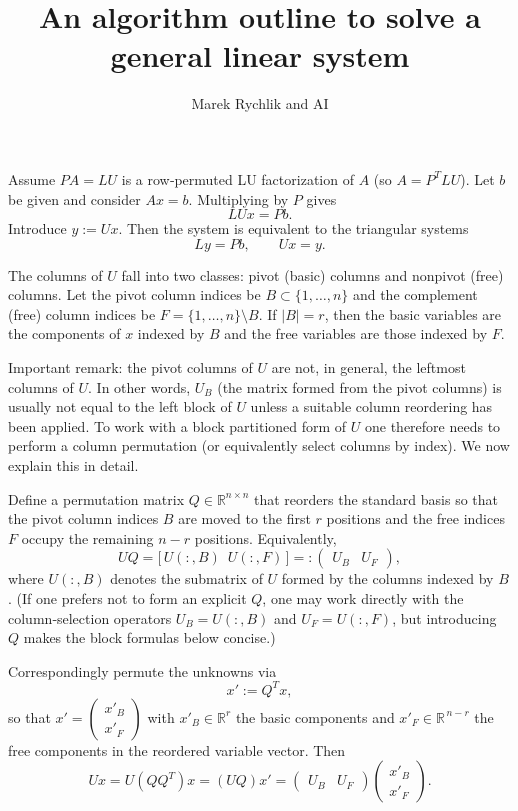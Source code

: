 \documentclass{article}
\title{An algorithm outline to solve a general linear system}
\author{Marek Rychlik and AI}
\begin{document}
\maketitle
Assume \(PA=LU\) is a row‑permuted LU factorization of \(A\) (so \(A=P^{T}LU\)). Let \(b\) be given and consider \(Ax=b\). Multiplying by \(P\) gives
\[
LUx=Pb.
\]
Introduce \(y:=Ux\). Then the system is equivalent to the triangular systems
\[
Ly=Pb,\qquad Ux=y.
\]

The columns of \(U\) fall into two classes: pivot (basic) columns and nonpivot (free) columns. Let the pivot column indices be \(B\subset\{1,\dots,n\}\) and the complement (free) column indices be \(F=\{1,\dots,n\}\setminus B\). If \(|B|=r\), then the basic variables are the components of \(x\) indexed by \(B\) and the free variables are those indexed by \(F\).

Important remark: the pivot columns of \(U\) are not, in general, the leftmost columns of \(U\). In other words, \(U_B\) (the matrix formed from the pivot columns) is usually not equal to the left block of \(U\) unless a suitable column reordering has been applied. To work with a block partitioned form of \(U\) one therefore needs to perform a column permutation (or equivalently select columns by index). We now explain this in detail.

Define a permutation matrix \(Q\in\mathbb{R}^{n\times n}\) that reorders the standard basis so that the pivot column indices \(B\) are moved to the first \(r\) positions and the free indices \(F\) occupy the remaining \(n-r\) positions. Equivalently,
\[
UQ = \bigl[\,U(:,B)\ \; U(:,F)\,\bigr] =: \begin{pmatrix}U_B & U_F\end{pmatrix},
\]
where \(U(:,B)\) denotes the submatrix of \(U\) formed by the columns indexed by \(B\). (If one prefers not to form an explicit \(Q\), one may work directly with the column‑selection operators \(U_B=U(:,B)\) and \(U_F=U(:,F)\), but introducing \(Q\) makes the block formulas below concise.)

Correspondingly permute the unknowns via
\[
x' := Q^{T}x,
\]
so that \(x' = \begin{pmatrix}x'_B\\ x'_F\end{pmatrix}\) with \(x'_B\in\mathbb{R}^{r}\) the basic components and \(x'_F\in\mathbb{R}^{\,n-r}\) the free components in the reordered variable vector. Then
\[
Ux = U(QQ^{T})x = (UQ)x' = \begin{pmatrix}U_B & U_F\end{pmatrix}\begin{pmatrix}x'_B\\[2pt] x'_F\end{pmatrix}.
\]
\end{document}
